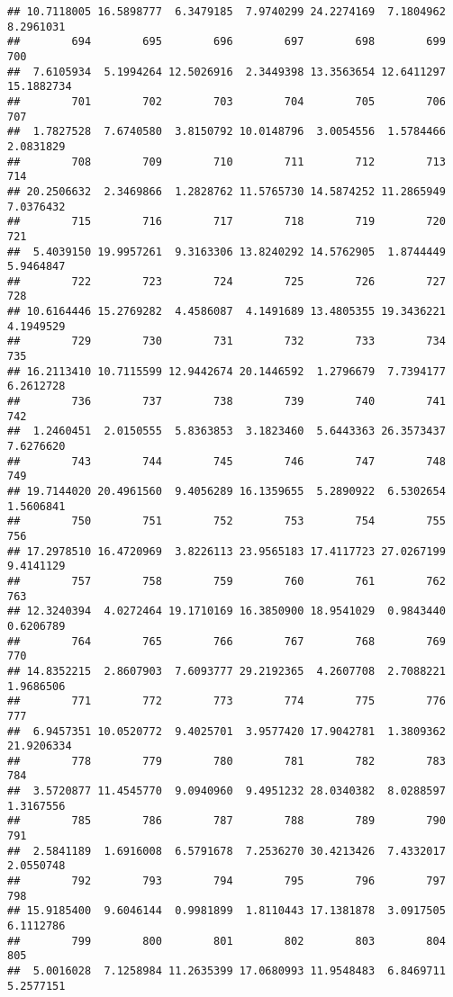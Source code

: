\documentclass[
]{article}
\begin{document}
\begin{verbatim}
## 10.7118005 16.5898777  6.3479185  7.9740299 24.2274169  7.1804962  8.2961031 
##        694        695        696        697        698        699        700 
##  7.6105934  5.1994264 12.5026916  2.3449398 13.3563654 12.6411297 15.1882734 
##        701        702        703        704        705        706        707 
##  1.7827528  7.6740580  3.8150792 10.0148796  3.0054556  1.5784466  2.0831829 
##        708        709        710        711        712        713        714 
## 20.2506632  2.3469866  1.2828762 11.5765730 14.5874252 11.2865949  7.0376432 
##        715        716        717        718        719        720        721 
##  5.4039150 19.9957261  9.3163306 13.8240292 14.5762905  1.8744449  5.9464847 
##        722        723        724        725        726        727        728 
## 10.6164446 15.2769282  4.4586087  4.1491689 13.4805355 19.3436221  4.1949529 
##        729        730        731        732        733        734        735 
## 16.2113410 10.7115599 12.9442674 20.1446592  1.2796679  7.7394177  6.2612728 
##        736        737        738        739        740        741        742 
##  1.2460451  2.0150555  5.8363853  3.1823460  5.6443363 26.3573437  7.6276620 
##        743        744        745        746        747        748        749 
## 19.7144020 20.4961560  9.4056289 16.1359655  5.2890922  6.5302654  1.5606841 
##        750        751        752        753        754        755        756 
## 17.2978510 16.4720969  3.8226113 23.9565183 17.4117723 27.0267199  9.4141129 
##        757        758        759        760        761        762        763 
## 12.3240394  4.0272464 19.1710169 16.3850900 18.9541029  0.9843440  0.6206789 
##        764        765        766        767        768        769        770 
## 14.8352215  2.8607903  7.6093777 29.2192365  4.2607708  2.7088221  1.9686506 
##        771        772        773        774        775        776        777 
##  6.9457351 10.0520772  9.4025701  3.9577420 17.9042781  1.3809362 21.9206334 
##        778        779        780        781        782        783        784 
##  3.5720877 11.4545770  9.0940960  9.4951232 28.0340382  8.0288597  1.3167556 
##        785        786        787        788        789        790        791 
##  2.5841189  1.6916008  6.5791678  7.2536270 30.4213426  7.4332017  2.0550748 
##        792        793        794        795        796        797        798 
## 15.9185400  9.6046144  0.9981899  1.8110443 17.1381878  3.0917505  6.1112786 
##        799        800        801        802        803        804        805 
##  5.0016028  7.1258984 11.2635399 17.0680993 11.9548483  6.8469711  5.2577151 

\end{verbatim}
\end{document}
